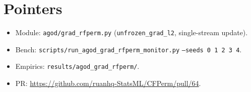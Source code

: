 \documentclass[11pt]{article}
\begin{document}
\section{Pointers}
\label{sec:code}

\begin{itemize}[leftmargin=*]
  \item Module: \texttt{agod/grad\_rfperm.py}
        (\texttt{unfrozen\_grad\_l2}, single-stream update).
  \item Bench: \texttt{scripts/run\_agod\_grad\_rfperm\_monitor.py}
        \texttt{--seeds 0 1 2 3 4}.
  \item Empirics: \texttt{results/agod\_grad\_rfperm/}.
  \item PR: \url{https://github.com/ruanhq-StatsML/CFPerm/pull/64}.
\end{itemize}
\end{document}
